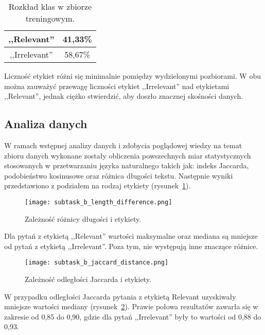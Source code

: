 \begin{table}[H]
\caption{Rozkład klas w zbiorze treningowym.}
\label{subtask_b_validation_set_statistics_score_table}
    \begin{center}
        \begin{tabular}{ |c|c| } 
            \hline
            ,,Relevant'' & 41,33\% \\
            \hline
            ,,Irrelevant'' & 58,67\% \\ 
            \hline
        \end{tabular}
    \end{center}
\end{table}

Liczność etykiet różni się minimalnie pomiędzy wydzielonymi pozbiorami. W obu można zauważyć przewagę liczności etykiet ,,Irrelevant'' nad etykietami ,,Relevant'', jednak ciężko stwierdzić, aby doszło znacznej skośności danych.

\subsection{Analiza danych}

W ramach wstępnej analizy danych i zdobycia poglądowej wiedzy na temat zbioru danych wykonane zostały obliczenia powszechnych miar statystycznych stosowanych w przetwarzaniu języka naturalnego takich jak: indeks Jaccarda, podobieństwo kosinusowe oraz różnica długości tekstu. Następnie wyniki przedstawiono z podziałem na rodzaj etykiety (rysunek~\ref{fig:lenghtb}).

\begin{figure}[H]
\caption{Zależność różnicy długości i etykiety.\label{fig:lenghtb}}
\centering
\texttt{[image: subtask\_b\_length\_difference.png]}
\end{figure}

Dla pytań z etykietą ,,Relevant'' wartości maksymalne oraz mediana są mniejsze od pytań z etykietą ,,Irrelevant''. Poza tym, nie występują inne znaczące różnice.

\begin{figure}[H]
\caption{Zależność odległości Jaccarda i etykiety. \label{fig:Jaccardb}}
\centering
\texttt{[image: subtask\_b\_jaccard\_distance.png]}
\end{figure}

W przypadku odległości Jaccarda pytania z etykietą Relevant uzyskiwały mniejsze wartości mediany (rysunek~\ref{fig:Jaccardb}). Prawie połowa rezultatów zawarła się w zakresie od 0,85 do 0,90, gdzie dla pytań ,,Irrelevant'' były to wartości od 0,88 do 0,93.

